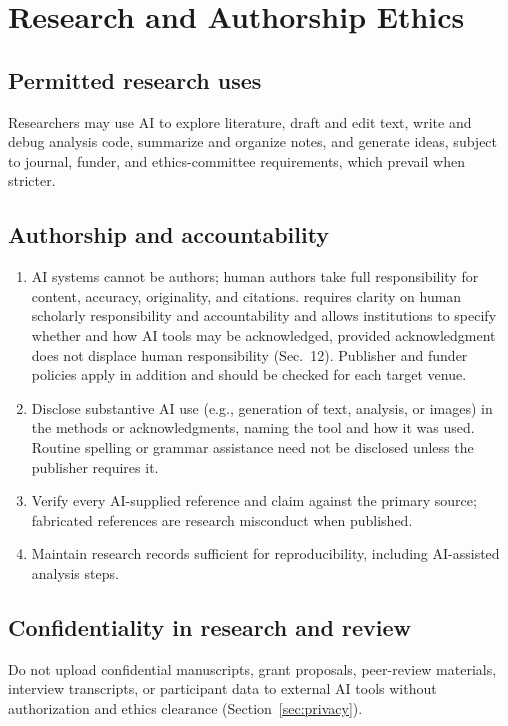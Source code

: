 \section{Research and Authorship Ethics}\label{sec:research}

\subsection{Permitted research uses}
Researchers may use AI to explore literature, draft and edit text, write and debug analysis code, summarize and organize notes, and generate ideas, subject to journal, funder, and ethics-committee requirements, which prevail when stricter.

\subsection{Authorship and accountability}
\begin{enumerate}
  \item AI systems cannot be authors; human authors take full responsibility for content, accuracy, originality, and citations. \cmo{} requires clarity on human scholarly responsibility and accountability and allows institutions to specify whether and how AI tools may be acknowledged, provided acknowledgment does not displace human responsibility (Sec.~12). Publisher and funder policies apply in addition and should be checked for each target venue.
  \item Disclose substantive AI use (e.g., generation of text, analysis, or images) in the methods or acknowledgments, naming the tool and how it was used. Routine spelling or grammar assistance need not be disclosed unless the publisher requires it.
  \item Verify every AI-supplied reference and claim against the primary source; fabricated references are research misconduct when published.
  \item Maintain research records sufficient for reproducibility, including AI-assisted analysis steps.
\end{enumerate}

\subsection{Confidentiality in research and review}
Do not upload confidential manuscripts, grant proposals, peer-review materials, interview transcripts, or participant data to external AI tools without authorization and ethics clearance (Section~\ref{sec:privacy}).

